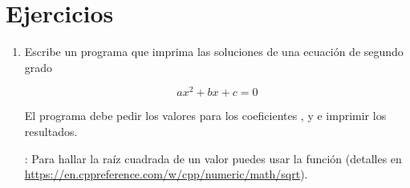 \section{Ejercicios}

\begin{enumerate}

\item Escribe un programa que imprima las soluciones de una ecuación de segundo grado

\[
a x^2 + b x + c = 0
\]

El programa debe pedir los valores para los coeficientes ,  y
 e imprimir los resultados.

: Para hallar la raíz cuadrada de un valor puedes usar la función
 (detalles en 
\url{https://en.cppreference.com/w/cpp/numeric/math/sqrt}).


\end{enumerate}
